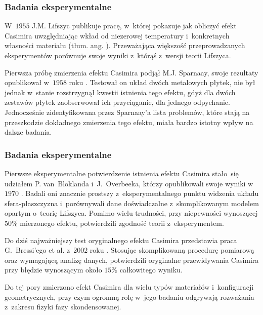\documentclass[10pt,t]{beamer}
\begin{document}
\begin{frame}
  \frametitle{Badania eksperymentalne}


  W~$1955$ J.M. Lifszyc publikuje pracę, w~której pokazuje jak obliczyć
  efekt Casimira uwzględniając wkład od niezerowej temperatury
  i~konkretnych własności materiału (tłum. ang.
  \parencite{Lifshitz-The-theory-of-molecular-ETC-Pub-1956}). Przeważająca
  większość przeprowadzanych eksperymentów porównuje swoje wyniki z~którąś
  z~wersji teorii Lifszyca.

  Pierwsza próbę zmierzenia efektu Casimira podjął M.J. Sparnaay, swoje
  rezultaty opublikował w~$1958$ roku
  \parencite{Sparnaay-Measurments-of-attractive-forces-ETC-Pub-1958}.
  Testował on układ dwóch metalowych płytek, nie był jednak w~stanie
  rozstrzygnął kwestii istnienia tego efektu, gdyż dla dwóch zestawów
  płytek zaobserwował ich przyciąganie, dla jednego odpychanie. Jednocześnie
  zidentyfikowana przez Sparnaay’a lista problemów, które stają na
  przeszkodzie dokładnego zmierzenia tego efektu, miała bardzo istotny
  wpływ na dalsze badania.

\end{frame}





\begin{frame}
  \frametitle{Badania eksperymentalne}


  Pierwsze eksperymentalne potwierdzenie istnienia efektu Casimira
  stało~się udziałem P. van~Bloklanda i~J.~Overbeeka, którzy
  opublikowali swoje wyniki w~$1970$
  \parencite{Blokland-Overbeek-van-der-Waals-Forces-between-ETC-1978}.
  Badali oni znacznie prostszy z~eksperymentalnego punktu widzenia
  układu sfera-płaszczyzna i~porównywali dane doświadczalne z~skomplikowanym
  modelem opartym o~teorię Lifszyca. Pomimo wielu trudności, przy
  niepewności wynoszącej $50\%$ mierzonego efektu, potwierdzili zgodność
  teorii z~eksperymentem.

  Do dziś najważniejszy test oryginalnego efektu Casimira przedstawia
  praca G.~Bressi’ego et al. z~$2002$ roku
  \parencite{Bressi-et-al-Measurement-of-the-Casimir-Force-ETC-2002}.
  Stosując skomplikowaną procedurę pomiarową oraz wymagającą analizę
  danych, potwierdzili oryginalne przewidywania Casimira przy błędzie
  wynoszącym około $15\%$ całkowitego wyniku.

  Do tej pory zmierzono efekt Casimira dla wielu typów materiałów
  i~konfiguracji geometrycznych, przy czym ogromną rolę w~jego badaniu
  odgrywają rozważania z~zakresu fizyki fazy skondensowanej.

\end{frame}
\end{document}

